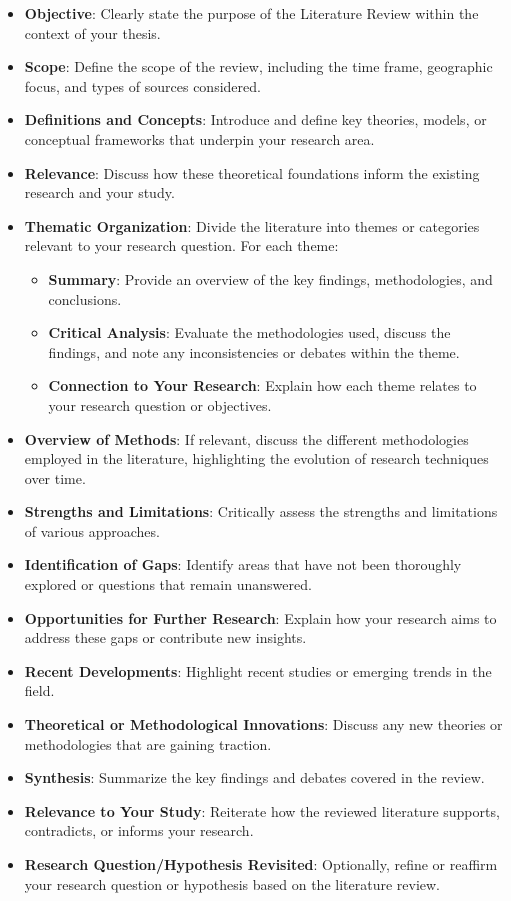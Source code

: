 \documentclass[
  12pt,
]{article}
\begin{document}
\begin{itemize}
\item
  \textbf{Objective}: Clearly state the purpose of the Literature Review
  within the context of your thesis.
\item
  \textbf{Scope}: Define the scope of the review, including the time
  frame, geographic focus, and types of sources considered.
\item
  \textbf{Definitions and Concepts}: Introduce and define key theories,
  models, or conceptual frameworks that underpin your research area.
\item
  \textbf{Relevance}: Discuss how these theoretical foundations inform
  the existing research and your study.
\item
  \textbf{Thematic Organization}: Divide the literature into themes or
  categories relevant to your research question. For each theme:

  \begin{itemize}
  \item
    \textbf{Summary}: Provide an overview of the key findings,
    methodologies, and conclusions.
  \item
    \textbf{Critical Analysis}: Evaluate the methodologies used, discuss
    the findings, and note any inconsistencies or debates within the
    theme.
  \item
    \textbf{Connection to Your Research}: Explain how each theme relates
    to your research question or objectives.
  \end{itemize}
\end{itemize}

\begin{itemize}
\item
  \textbf{Overview of Methods}: If relevant, discuss the different
  methodologies employed in the literature, highlighting the evolution
  of research techniques over time.
\item
  \textbf{Strengths and Limitations}: Critically assess the strengths
  and limitations of various approaches.
\item
  \textbf{Identification of Gaps}: Identify areas that have not been
  thoroughly explored or questions that remain unanswered.
\item
  \textbf{Opportunities for Further Research}: Explain how your research
  aims to address these gaps or contribute new insights.
\item
  \textbf{Recent Developments}: Highlight recent studies or emerging
  trends in the field.
\item
  \textbf{Theoretical or Methodological Innovations}: Discuss any new
  theories or methodologies that are gaining traction.
\item
  \textbf{Synthesis}: Summarize the key findings and debates covered in
  the review.
\item
  \textbf{Relevance to Your Study}: Reiterate how the reviewed
  literature supports, contradicts, or informs your research.
\item
  \textbf{Research Question/Hypothesis Revisited}: Optionally, refine or
  reaffirm your research question or hypothesis based on the literature
  review.
\end{itemize}
\end{document}
